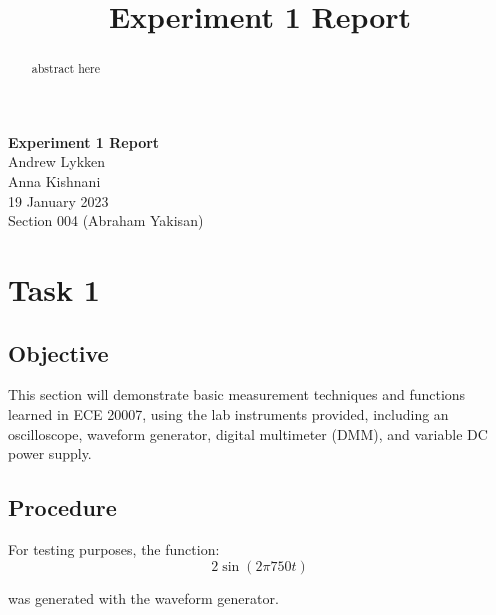 \documentclass[notitlepage, 12pt]{report}  %
\title{Experiment 1 Report}
\begin{document}


\begin{center}
\large \textbf{Experiment 1 Report} \\ %
\small 
Andrew Lykken\\
Anna Kishnani\\
19 January 2023\\
Section 004 (Abraham Yakisan)\\

\end{center}

\vspace{4in}


\begin{abstract}
abstract here 
\end{abstract}

\newpage



\section*{Task 1} %


\subsection*{Objective}
\indent\indent This section will demonstrate basic measurement techniques and functions learned in ECE 20007, using 
the lab instruments provided, including an oscilloscope, waveform generator, digital multimeter (DMM), 
and variable DC power supply. 

\subsection*{Procedure}
\indent\indent For testing purposes, the function:
\begin{equation}
    2 \sin(2\pi 750t)
\end{equation}

was generated with the waveform generator.\\
\end{document}
